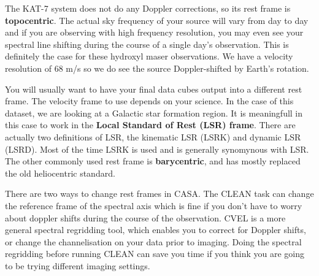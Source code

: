 \documentclass[force,almostfull,justified]{tufte-book}
\begin{document}
The KAT-7 system does not do any Doppler corrections, so its rest frame is \textbf{topocentric}.  The
actual sky frequency of your source will vary from day to day and if you are observing with high
frequency resolution, you may even see your spectral line shifting during the course of a single day's
observation.  This is definitely the case for these hydroxyl maser observations.  We have a velocity
resolution of 68 m/s so we do see the source Doppler-shifted by Earth's rotation.

You will usually want to have your final data cubes output into a different rest frame. The velocity
frame to use depends on your science.  In the case of this dataset, we are looking at a Galactic star
formation region.  It is meaningfull in this case to work in the \textbf{Local Standard of Rest (LSR)
frame}.  There are actually two definitions of LSR, the kinematic LSR (LSRK) and dynamic LSR (LSRD).
Most of the time LSRK is used and is generally synomynous with LSR.  The other commonly used rest
frame is \textbf{barycentric}, and has mostly replaced the old heliocentric standard.

There are two ways to change rest frames in CASA.  The CLEAN task can change the reference frame of
the spectral axis which is fine if you don't have to worry about doppler shifts during the course of
the observation.  CVEL is a more general spectral regridding tool, which enables you to correct for
Doppler shifts, or change the channelisation on your data prior to imaging.  Doing the spectral
regridding before running CLEAN can save you time if you think you are going to be trying different
imaging settings.
\end{document}
